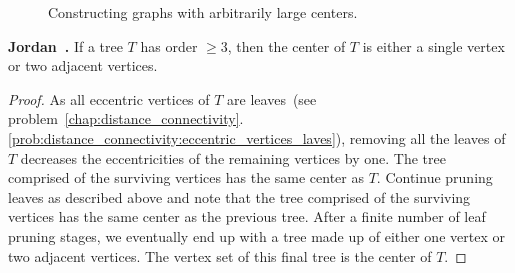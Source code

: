 \begin{figure}[!htbp]
\centering
{}
\qquad
{}
\qquad
{}
\caption{Constructing graphs with arbitrarily large centers.}
\label{fig:distance_connectivity:graphs_arbitrarily_large_centers}
\end{figure}

\begin{theorem}
\textbf{Jordan~\cite{Jordan1869}.}
If a tree $T$ has order $\geq 3$, then the center of $T$ is either a
single vertex or two adjacent vertices.
\end{theorem}

\begin{proof}
As all eccentric vertices of $T$ are leaves~(see
problem~\ref{chap:distance_connectivity}.\ref{prob:distance_connectivity:eccentric_vertices_laves}),
removing all the leaves of $T$ decreases the eccentricities of the
remaining vertices by one. The tree comprised of the surviving
vertices has the same center as $T$. Continue pruning leaves as
described above and note that the tree comprised of the surviving
vertices has the same center as the previous tree. After a finite
number of leaf pruning stages, we eventually end up with a tree made
up of either one vertex or two adjacent vertices. The vertex set of
this final tree is the center of $T$.
\end{proof}


